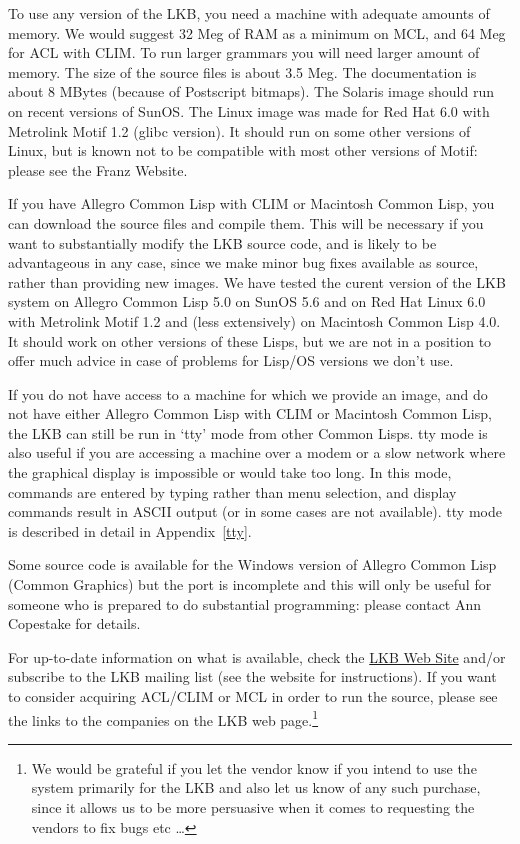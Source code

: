 \documentclass[12pt]{report}
\begin{document}
To use any version of the LKB, 
you need a machine with adequate amounts of memory.
We would suggest 32 Meg of RAM as a minimum on MCL, 
and 64 Meg for ACL with CLIM.
To run larger grammars
you will need larger amount of memory.  The size of the source
files is about 3.5 Meg.  The documentation is about 8 MBytes
(because of Postscript bitmaps).
The Solaris image should run on recent versions of SunOS.
The Linux image was made for Red Hat 6.0 with Metrolink Motif 1.2
(glibc version).  It should run on some other versions of Linux, but
is known not to be compatible with most other versions of Motif: 
please see the Franz Website.

If you have Allegro Common Lisp with CLIM or Macintosh Common Lisp, you 
can download the source files
and compile them.  This will be necessary
if you want to substantially
modify the LKB source code, and is likely to be
advantageous in any case, since we make minor bug fixes available
as source, rather than providing new images.
We have tested the curent version of the LKB
system on Allegro Common Lisp 5.0 on SunOS 5.6
and on Red Hat Linux 6.0 with Metrolink Motif 1.2
and (less extensively) on 
Macintosh Common Lisp 4.0.
It should work on other versions of these Lisps, but we are not in a position
to offer much advice in case of problems for Lisp/OS versions
we don't use.

If you do not have access to a machine for which we provide an image,
and do not have either Allegro Common Lisp with CLIM or Macintosh Common
Lisp, the LKB can still be run in `tty' mode from other Common Lisps.
tty mode is also useful if you are accessing a machine over a 
modem or a slow network
where the graphical display is impossible or would take too long.
In this mode, commands are entered by typing rather than menu selection,
and display commands result in ASCII output (or in some cases are
not available).
tty mode is described in detail in Appendix~\ref{tty}.

Some source code is available for 
the Windows version of Allegro Common Lisp (Common Graphics) but the port 
is incomplete and this will only be useful for someone who is prepared
to do substantial programming: please contact Ann Copestake for details.

For up-to-date information on what is available, check the 
\href{http://www-csli.stanford.edu/~aac/lkb.html}{LKB Web Site}
and/or subscribe to the LKB mailing list (see the website for instructions).
If you want to consider acquiring ACL/CLIM or MCL in order to run the source,
please see the links to the companies on the LKB web page.\footnote{We 
would be grateful if you let the vendor know if you intend to use the
system primarily for the LKB
and also let us know of any such purchase, since it allows us to
be more persuasive when it comes to requesting the vendors 
to fix bugs etc \ldots}
\end{document}
